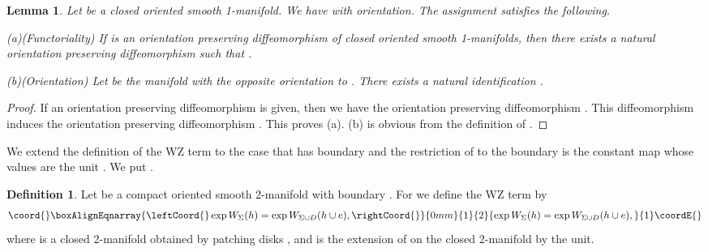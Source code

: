 \documentclass[a4paper,a4paper]{article}
\newtheorem{lem}[thm]{Lemma}
\theoremstyle{definition}
\newtheorem{dfn}[thm]{Definition}
\theoremstyle{remark}
\providecommand{\G}{\mathcal{G}}
\begin{document}
\begin{lem} \label{lem_axiom_disk}
Let \coordHE{} be a closed oriented smooth 1-manifold. We have \coordHE{} with orientation. The assignment \coordHE{} satisfies the following.

(a)(Functoriality) If \coordHE{} is an orientation preserving diffeomorphism of closed oriented smooth 1-manifolds, then there exists a natural orientation preserving diffeomorphism \coordHE{} such that \coordHE{}.

(b)(Orientation) Let \coordHE{} be the manifold with the opposite orientation to \coordHE{}. There exists a natural identification \coordHE{}.
\end{lem}

\begin{proof}
If an orientation preserving diffeomorphism \coordHE{} is given, then we have the orientation preserving diffeomorphism \coordHE{}. This diffeomorphism induces the orientation preserving diffeomorphism \coordHE{}. This proves (a). (b) is obvious from the definition of \coordHE{}.
\end{proof}

We extend the definition of the WZ term \coordHE{} to the case that \myHighlight{$\Sigma$}\coordHE{} has boundary and the restriction of \coordHE{} to the boundary is the constant map whose values are the unit \coordHE{}. We put \myHighlight{$\G_{\Sigma,0} = \{ h \in \G_\Sigma | \partial h = e \}$}\coordHE{}.

\begin{dfn} \label{dfn_WZ_boundary_unit}
Let \myHighlight{$\Sigma$}\coordHE{} be a compact oriented smooth 2-manifold with boundary \coordHE{}. For \myHighlight{$h \in \G_{\Sigma,0}$}\coordHE{} we define the WZ term by
\begin{eqnarray}\coord{}\boxAlignEqnarray{\leftCoord{}
\exp W_\Sigma(h) = \exp W_{\Sigma \cup D} (h \cup e) ,
\rightCoord{}}{0mm}{1}{2}{
\exp W_\Sigma(h) = \exp W_{\Sigma \cup D} (h \cup e) ,
}{1}\coordE{}\end{eqnarray}
where \coordHE{} is a closed 2-manifold obtained by patching disks \coordHE{}, and \coordHE{} is the extension of \coordHE{} on the closed 2-manifold by the unit.
\end{dfn}
\end{document}
